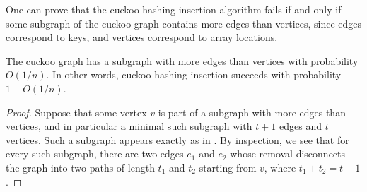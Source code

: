 \documentclass{patmorin}
\begin{document}
One can prove that
the cuckoo hashing insertion algorithm fails if and only if  
some subgraph of
the cuckoo graph contains more edges than vertices, since edges
correspond to keys, and vertices correspond to array locations.
\begin{lem}
  The cuckoo graph has a subgraph with more edges than vertices with
  probability $O(1/n)$. In other words, cuckoo hashing insertion
  succeeds with probability $1 - O(1/n)$.
\end{lem}
\begin{proof}
  Suppose that some vertex $v$ is part of a subgraph with more edges
  than vertices, and in particular a minimal such subgraph with $t +
  1$ edges and $t$ vertices. Such a subgraph appears exactly as in
  . By inspection, we see that for every such 
  subgraph, there are two edges
  $e_1$ and $e_2$ whose removal disconnects the graph into two paths
  of length $t_1$ and $t_2$ starting from $v$, where $t_1 + t_2 = t -
  1$.


\end{proof}
\end{document}
